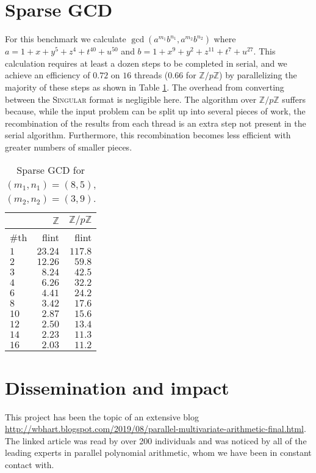 \documentclass{deliverablereport}
\begin{document}
\section{Sparse GCD}
For this benchmark we calculate $\operatorname{gcd}(a^{m_1}b^{n_1}, a^{m_2}b^{n_2})$\text{,}
where $a=1+x+y^5+z^4+t^{40}+u^{50}$ and $b=1+x^9+y^2+z^{11}+t^7+u^{27}$. This calculation requires at least a dozen steps to be completed in serial, and we achieve an efficiency of $0.72$ on $16$ threads ($0.66$ for $\mathbb{Z}/p\mathbb{Z}$) by parallelizing the majority of these steps as shown in Table \ref{table_sparse_gcd}. The overhead from converting between the \textsc{Singular} format is negligible here. The algorithm over $\mathbb{Z}/p\mathbb{Z}$ suffers because, while the input problem can be split up into several pieces of work, the recombination of the results from each thread is an extra step not present in the serial algorithm. Furthermore, this recombination becomes less efficient with greater numbers of smaller pieces.
\begin{table}[htb]
\begin{tabular}{l | r | r | }
 & $\mathbb{Z}$ & $\mathbb{Z}/p \mathbb{Z}$ \\ \hline
\#th   & flint & flint\\ \hline
$1$   & $23.24$ & $117.8$ \\ \hline
$2$   & $12.26$ & $59.8$ \\ \hline
$3$   & $8.24$  & $42.5$ \\ \hline
$4$   & $6.26$  & $32.2$ \\ \hline
$6$   & $4.41$  & $24.2$ \\ \hline
$8$   & $3.42$  & $17.6$ \\ \hline
$10$  & $2.87$  & $15.6$ \\ \hline
$12$  & $2.50$  & $13.4$ \\ \hline
$14$  & $2.23$  & $11.3$ \\ \hline
$16$  & $2.03$  & $11.2$ \\ \hline
\end{tabular}
\caption{Sparse GCD for $(m_1, n_1) = (8, 5)$, $(m_2, n_2) = (3, 9)$.}
\label{table_sparse_gcd}
\end{table}

\section{Dissemination and impact}

This project has been the topic of an extensive blog \url{http://wbhart.blogspot.com/2019/08/parallel-multivariate-arithmetic-final.html}. The linked article was read by over 200 individuals and was noticed by all of the leading experts in parallel polynomial arithmetic, whom we have been in constant contact with.
\end{document}
